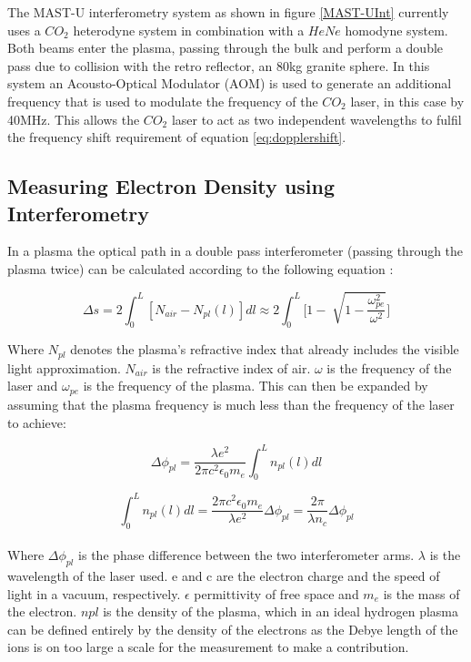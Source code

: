 \documentclass[12pt,a4paper,oneside]{report}
\begin{document}
The MAST-U interferometry system as shown in figure \autoref{MAST-UInt} currently uses a $CO_{2}$ heterodyne system in combination with a $HeNe$ homodyne system. Both beams enter the plasma, passing through the bulk and perform a double pass due to collision with the retro reflector, an 80kg granite sphere. In this system an Acousto-Optical Modulator (AOM) is used to generate an additional frequency that is used to modulate the frequency of the $CO_{2}$ laser, in this case by 40MHz. This allows the $CO_{2}$ laser to act as two independent wavelengths to fulfil the frequency shift requirement of equation \ref{eq:dopplershift}.

    \subsection{Measuring Electron Density using Interferometry}
In a plasma the optical path in a double pass interferometer (passing through the plasma twice) can be calculated according to the following equation \cite[p.~26]{Brunner2017} :

\begin{equation}
	\Delta s = 2 \int_{0}^{L} [N_{air} - N_{pl}(l)]dl \approx 2 \int_{0}^{L} \Bigg[1 - \sqrt[]{1-\frac{\omega_{pe}^{2}}{\omega^{2}}}\Bigg]
	\label{eq:opticalpathint}
\end{equation}

Where $N_{pl}$ denotes the plasma's refractive index that already includes the visible light approximation. $N_{air}$ is the refractive index of air. $\omega$ is the frequency of the laser and $\omega_{pe}$ is the frequency of the plasma. This can then be expanded by assuming that the plasma frequency is much less than the frequency of the laser to achieve:

\begin{equation}
	\Delta\phi_{pl} = \frac{\lambda e^{2}}{2 \pi c^{2} \epsilon_{0} m_{e}} \int_{0}^{L} n_{pl} (l) dl
	\label{eq:plasmaphase}
\end{equation}

\begin{equation}
	\int_{0}^{L} n_{pl} (l) dl = \frac{2 \pi c^{2} \epsilon_{0} m_{e}}{\lambda e^{2}} \Delta\phi_{pl} = \frac{2 \pi}{\lambda n_{c}} \Delta\phi_{pl}
	\label{eq:phaseintegral}
\end{equation}
\\
Where $\Delta\phi_{pl}$ is the phase difference between the two interferometer arms. $\lambda$ is the wavelength of the laser used. e and c are the electron charge and the speed of light in a vacuum, respectively. $\epsilon$ permittivity of free space and $m_{e}$ is the mass of the electron. $n{pl}$ is the density of the plasma, which in an ideal hydrogen plasma can be defined entirely by the density of the electrons as the Debye length of the ions is on too large a scale for the measurement to make a contribution. 
\end{document}
